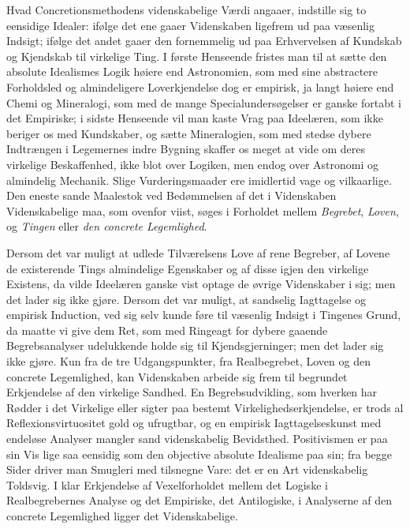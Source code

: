 \documentclass[12pt]{book}
\newcommand{\apage}[1]{\marginnote{\footnotesize\textit{[#1]}}}
\begin{document}
Hvad Concretionsmethodens videnskabelige Værdi angaaer, indstille sig to
eensidige Idealer: ifølge det ene gaaer Videnskaben ligefrem ud paa
væsenlig  \apage{159} Indsigt; ifølge det andet gaaer den fornemmelig ud paa
Erhvervelsen af Kundskab og Kjendskab til virkelige Ting. I første
Henseende fristes man til at sætte den absolute Idealismes Logik høiere end
Astronomien, som med sine abstractere Forholdsled og almindeligere
Loverkjendelse dog er empirisk, ja langt høiere end Chemi og Mineralogi,
som med de mange Specialundersøgelser er ganske fortabt i det Empiriske; i
sidste Henseende vil man kaste Vrag paa Ideelæren, som ikke beriger os med
Kundskaber, og sætte Mineralogien, som med stedse dybere Indtrængen i
Legemernes indre Bygning skaffer os meget at vide om deres virkelige
Beskaffenhed, ikke blot over Logiken, men endog over Astronomi og
almindelig Mechanik. Slige Vurderingsmaader ere imidlertid vage og
vilkaarlige. Den eneste sande Maalestok ved Bedømmelsen af det i
Videnskaben Videnskabelige maa, som ovenfor viist, søges i Forholdet mellem
\emph{Begrebet}, \emph{Loven}, og \emph{Tingen} eller \emph{den concrete Legemlighed}.

Dersom det var muligt at udlede Tilværelsens Love af rene Begreber, af
Lovene de existerende Tings almindelige Egenskaber og af disse igjen den
virkelige Existens, da vilde Ideelæren ganske vist optage de øvrige
Videnskaber i sig; men det lader sig ikke gjøre. Dersom det var muligt, at
sandselig Iagttagelse og empirisk Induction, ved sig selv kunde føre til
væsenlig Indsigt i Tingenes Grund, da maatte vi give dem Ret, som med
Ringeagt for dybere gaaende Begrebsanalyser udelukkende holde sig til
Kjendsgjerninger; men det lader sig ikke gjøre. Kun fra de tre
Udgangspunkter, \apage{160} fra Realbegrebet, Loven og den concrete Legemlighed, kan
Videnskaben arbeide sig frem til begrundet Erkjendelse af den virkelige
Sandhed. En Begrebsudvikling, som hverken har Rødder i det Virkelige eller
sigter paa bestemt Virkelighedserkjendelse, er trods al
Reflexionsvirtuositet gold og ufrugtbar, og en empirisk Iagttagelseskunst
med endeløse Analyser mangler sand videnskabelig Bevidsthed. Positivismen
er paa sin Vis lige saa eensidig som den objective absolute Idealisme paa
sin; fra begge Sider driver man Smugleri med tilsnegne Vare: det er en Art
videnskabelig Toldsvig. I klar Erkjendelse af Vexelforholdet mellem det
Logiske i Realbegrebernes Analyse og det Empiriske, det Antilogiske, i
Analyserne af den concrete Legemlighed ligger det Videnskabelige.
\end{document}

